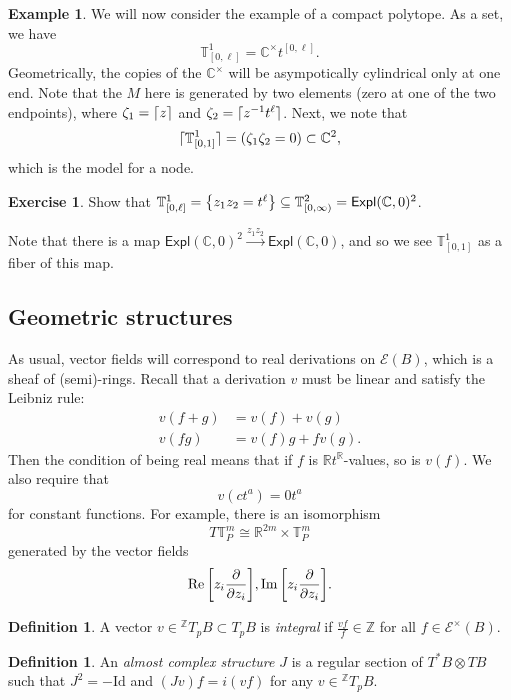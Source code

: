 \documentclass[leqno, openany]{memoir}
\DeclarePairedDelimiter{\ceil}{\lceil}{\rceil}
\theoremstyle{definition}
\newtheorem{defn}[thm]{Definition}
\newtheorem{exm}[thm]{Example}
\newtheorem{exer}[thm]{Exercise}
\theoremstyle{remark}
\theoremstyle{plain}
\theoremstyle{definition}
\theoremstyle{remark}
\newcommand{\E}{\mathcal{E}}
\newcommand{\R}{\mathbb{R}}
\newcommand{\C}{\mathbb{C}}
\newcommand{\Z}{\mathbb{Z}}
\newcommand{\mc}[1]{\mathcal{#1}}
\newcommand{\T}{\mathbb{T}}
\newcommand{\mr}[1]{\mathrm{#1}}
\newcommand{\ms}[1]{\mathsf{#1}}
\begin{document}
\begin{exm}
  We will now consider the example of a compact polytope. As a set, we have
  \[ \T^1_{[0,\ell]} = \C^{\times}t^{[0,\ell]}. \]
  Geometrically, the copies of the $\C^{\times}$ will be asympotically cylindrical only at one end. Note that the $M$ here is generated by two elements (zero at one of the two endpoints), where $\zeta_1 = \ceil{z}$ and $\zeta_2 = \ceil{z^{-1}t^{\ell}}$. Next, we note that
  \[ \ceil{\T^1_{[0,1]}} = (\zeta_1 \zeta_2 = 0) \subset \C^2, \]
  which is the model for a node.
\end{exm}

\begin{exer}
Show that $\mathbb{T}^1_{[0,\ell]} = \qty{z_1z_2 = t^{\ell}} \subseteq \mathbb{T}^2_{[0, \infty)} = \ms{Expl}(\C, 0)^2$.
\end{exer}
Note that there is a map $\ms{Expl}(\C, 0)^2 \xrightarrow{z_1z_2} \ms{Expl}(\C, 0)$, and so we see $\T^1_{[0,1]}$ as a fiber of this map.

\subsection{Geometric structures}
\label{subsec:geometry}



As usual, vector fields will correspond to real derivations on $\mc{E}(B)$, which is a sheaf of (semi)-rings. Recall that a derivation $v$ must be linear and satisfy the Leibniz rule:
\begin{align*}
  v(f+g) &= v(f) + v(g) \\
  v(fg) &= v(f) g + f v(g).
\end{align*}
Then the condition of being real means that if $f$ is $\R t^{\R}$-values, so is $v(f)$. We also require that
\[ v(ct^a) = 0 t^a \]
for constant functions. For example, there is an isomorphism
\[ T \T_P^m \cong \R^{2m} \times \T_P^m \]
generated by the vector fields
\[ \Re \qty[z_i \pdv{z_i}], \Im \qty[z_i \pdv{z_i}]. \]

\begin{defn}
  A vector $v \in {}^{\Z}T_p B \subset T_p B$ is \textit{integral} if $\frac{vf}{f} \in \Z$ for all $f \in \E^{\times}(B)$.
\end{defn}

\begin{defn}
An \textit{almost complex structure} $J$ is a regular section of $T^*B \otimes TB$ such that $J^2 = - \mr{Id}$ and $(Jv) f = i(vf)$ for any $v \in {}^{\Z}T_p B$.
\end{defn}
\end{document}
